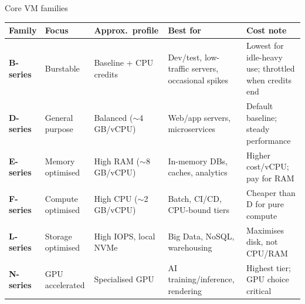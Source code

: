 \documentclass[aspectratio=169,xcolor=dvipsnames]{beamer}
\begin{document}
\begin{frame}[shrink=10]{Core VM families}
	\centering
	\renewcommand{\arraystretch}{1.4}
	\setlength{\tabcolsep}{4pt}
	\small
	
	\begin{tabular}{@{} L{1.6cm} L{2.2cm} L{2.6cm} L{3.8cm} L{3.2cm} @{}}
		\toprule
		\textbf{Family} & \textbf{Focus} & \textbf{Approx.\ profile} & \textbf{Best for} & \textbf{Cost note} \\
		\midrule
		\textbf{B-series} & Burstable
		& Baseline + CPU credits
		& Dev/test, low-traffic servers, occasional spikes
		& Lowest for idle-heavy use; throttled when credits end \\
		\addlinespace
		\textbf{D-series} & General purpose
		& Balanced ($\sim$4\,GB/vCPU)
		& Web/app servers, microservices
		& Default baseline; steady performance \\
		\addlinespace
		\textbf{E-series} & Memory optimised
		& High RAM ($\sim$8\,GB/vCPU)
		& In-memory DBs, caches, analytics
		& Higher cost/vCPU; pay for RAM \\
		\addlinespace
		\textbf{F-series} & Compute optimised
		& High CPU ($\sim$2\,GB/vCPU)
		& Batch, CI/CD, CPU-bound tiers
		& Cheaper than D for pure compute \\
		\addlinespace
		\textbf{L-series} & Storage optimised
		& High IOPS, local NVMe
		& Big Data, NoSQL, warehousing
		& Maximises disk, not CPU/RAM \\
		\addlinespace
		\textbf{N-series} & GPU accelerated
		& Specialised GPU
		& AI training/inference, rendering
		& Highest tier; GPU choice critical \\
		\bottomrule
	\end{tabular}
\end{frame}
\end{document}
